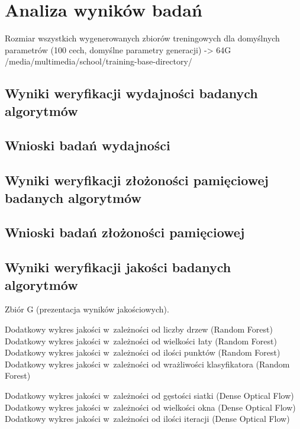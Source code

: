 \chapter{Analiza wyników badań}\label{Chapter_AnalizaRezultatow}

  Rozmiar wszystkich wygenerowanych zbiorów treningowych dla domyślnych parametrów (100 cech, domyślne parametry generacji) -> 64G /media/multimedia/school/training-base-directory/

  \section{Wyniki weryfikacji wydajności badanych algorytmów}\label{Section_Performance}

  \section{Wnioski badań wydajności}\label{Section_PerformanceWnioski}

  \section{Wyniki weryfikacji złożoności pamięciowej badanych algorytmów}\label{Section_MemoryPerformance}

  \section{Wnioski badań złożoności pamięciowej}\label{Section_MemoryPerformanceWnioski}

  \section{Wyniki weryfikacji jakości badanych algorytmów}\label{Section_Quality}

  Zbiór G (prezentacja wyników jakościowych).

  Dodatkowy wykres jakości w~zależności od liczby drzew (Random Forest)
  Dodatkowy wykres jakości w~zależności od wielkości łaty (Random Forest)
  Dodatkowy wykres jakości w~zależności od ilości punktów (Random Forest)
  Dodatkowy wykres jakości w~zależności od wrażliwości klasyfikatora (Random Forest)

  Dodatkowy wykres jakości w~zależności od gęstości siatki (Dense Optical Flow)
  Dodatkowy wykres jakości w~zależności od wielkości okna (Dense Optical Flow)
  Dodatkowy wykres jakości w~zależności od ilości iteracji (Dense Optical Flow)

